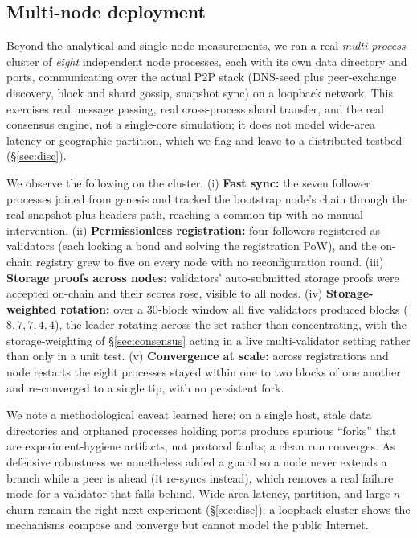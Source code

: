\subsection{Multi-node deployment}
Beyond the analytical and single-node measurements, we ran a real \emph{multi-process} cluster of
\emph{eight} independent node processes, each with its own data directory and ports, communicating
over the actual P2P stack (DNS-seed plus peer-exchange discovery, block and shard gossip, snapshot
sync) on a loopback network. This exercises real message passing, real cross-process shard transfer,
and the real consensus engine, not a single-core simulation; it does not model wide-area latency or
geographic partition, which we flag and leave to a distributed testbed (\S\ref{sec:disc}).

We observe the following on the cluster. (i) \textbf{Fast sync:} the seven follower processes joined
from genesis and tracked the bootstrap node's chain through the real snapshot-plus-headers path,
reaching a common tip with no manual intervention. (ii) \textbf{Permissionless registration:} four
followers registered as validators (each locking a bond and solving the registration PoW), and the
on-chain registry grew to five on every node with no reconfiguration round. (iii) \textbf{Storage
proofs across nodes:} validators' auto-submitted storage proofs were accepted on-chain and their
scores rose, visible to all nodes. (iv) \textbf{Storage-weighted rotation:} over a 30-block window
all five validators produced blocks ($8,7,7,4,4$), the leader rotating across the set rather than
concentrating, with the storage-weighting of \S\ref{sec:consensus} acting in a live multi-validator
setting rather than only in a unit test. (v) \textbf{Convergence at scale:} across registrations and
node restarts the eight processes stayed within one to two blocks of one another and re-converged to
a single tip, with no persistent fork.

We note a methodological caveat learned here: on a single host, stale data directories and
orphaned processes holding ports produce spurious ``forks'' that are experiment-hygiene artifacts,
not protocol faults; a clean run converges. As defensive robustness we nonetheless added a guard so a
node never extends a branch while a peer is ahead (it re-syncs instead), which removes a real
failure mode for a validator that falls behind. Wide-area latency, partition, and large-$n$ churn
remain the right next experiment (\S\ref{sec:disc}); a loopback cluster shows the mechanisms compose
and converge but cannot model the public Internet.

